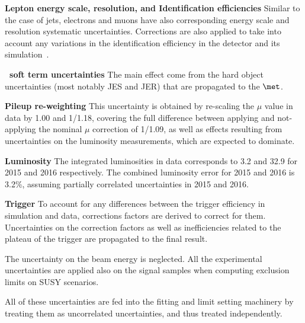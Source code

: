 \textbf{Lepton energy scale, resolution, and Identification efficiencies}
Similar to the case of jets, electrons and muons have also corresponding 
energy scale and resolution systematic uncertainties. Corrections are 
also applied to take into account any variations in the identification 
efficiency in the detector and its simulation~\cite{ATLAS-CONF-2016-024,Aad:2016jkr,ATLAS-CONF-2016-024}.

\textbf{\met\ soft term uncertainties}
The main effect come from the hard object uncertainties (most notably JES and 
JER) that are propagated to the $\met$.

\textbf{Pileup re-weighting}
This uncertainty is obtained by re-scaling the $\mu$ value in data by 1.00 and 1/1.18, 
covering the full difference between applying and not-applying the nominal $\mu$ correction of 1/1.09, 
as well as effects resulting from uncertainties on the luminosity measurements, which are expected to dominate.

\textbf{Luminosity}
The integrated luminosities in data corresponds to 3.2 \ifb and 32.9 \ifb 
for 2015 and 2016 respectively. The combined luminosity error for 2015 and 2016 is 3.2\%, assuming partially correlated uncertainties in 2015 and 2016.


\textbf{Trigger}
To account for any differences between the trigger efficiency in simulation 
and data, corrections factors are derived to correct for them. 
Uncertainties on the correction factors as well as inefficiencies 
related to the plateau of the trigger are propagated to the final result.

The uncertainty on the beam energy is neglected. 
All the experimental uncertainties are applied also on the signal samples when computing exclusion limits on SUSY scenarios. 


All of these uncertainties are fed into the fitting and limit setting 
machinery by treating them as uncorrelated uncertainties, and thus 
treated independently. 
